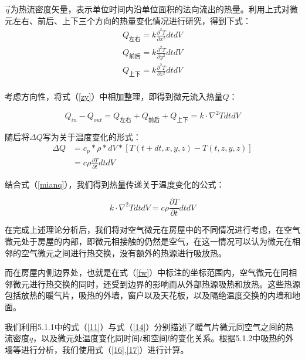 \documentclass{my_paper}
\begin{document}
$ \vec{q} $为热流密度矢量，表示单位时间内沿单位面积的法向流出的热量。利用上式对微元左右、前后、上下三个方向的热量变化情况进行研究，得到下式：
\begin{equation}
    \begin{aligned}
        Q_{\text{左右}} = k\frac{\partial^2 T}{\partial x^2} dtdV\\
        Q_{\text{前后}} = k\frac{\partial^2 T}{\partial y^2} dtdV\\
        Q_{\text{上下}} = k\frac{\partial^2 T}{\partial z^2} dtdV\\
    \end{aligned}
    \label{zy}
\end{equation}

考虑方向性，将式（\ref{zy}）中相加整理，即得到微元流入热量$Q$：

\begin{equation}
    Q_{in}-Q_{out} = Q_{\text{左右}}+Q_{\text{前后}}+Q_{\text{上下}} = k\cdot \nabla^2 T dtdV
\end{equation}

随后将$\Delta Q$写为关于温度变化的形式：
\begin{equation}
    \begin{aligned}
        \Delta Q &= c_p * \rho * dV * [T(t+dt,x,y,z)-T(t,z,y,z)]\\
        &=c\rho \frac{\partial T}{\partial t}dtdV
    \end{aligned}
    \label{23}
\end{equation}

结合式（\ref{mianq}），我们得到热量传递关于温度变化的公式：

\begin{equation}
    k\cdot \nabla^2 T dtdV = c\rho \frac{\partial T}{\partial t}dtdV
\label{}
\end{equation}

在完成上述理论分析后，我们将对空气微元在房屋中的不同情况进行考虑，在空气微元处于房屋的内部，即微元相接触的仍然是空气，在这一情况可以认为微元在相邻的空气微元之间进行热交换，没有额外的热源进行吸放热。

而在房屋内侧边界处，也就是在式（\ref{fw}）中标注的坐标范围内，空气微元在同相邻微元进行热交换的同时，还受到边界的影响而从外部热源吸热和放热。这些热源包括放热的暖气片，吸热的外墙，窗户以及天花板，以及隔绝温度交换的内墙和地面。

我们利用5.1.1中的式（\ref{11}）与式（\ref{14}）分别描述了暖气片微元同空气之间的热流密度$q$，以及微元处温度变化同时间$t$和空间$l$的变化关系。根据5.1.2中吸热的外墙等进行分析，我们使用式（\ref{16},\ref{17}）进行计算。
\end{document}

